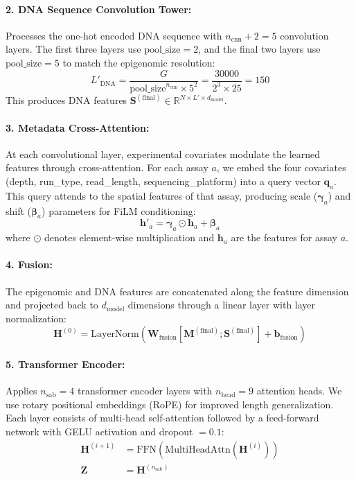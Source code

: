 \paragraph{2. DNA Sequence Convolution Tower:}
Processes the one-hot encoded DNA sequence with $n_{\text{cnn}} + 2 = 5$ convolution layers. The first three layers use $\text{pool\_size} = 2$, and the final two layers use $\text{pool\_size} = 5$ to match the epigenomic resolution:
\begin{equation}
    L'_{\text{DNA}} = \frac{G}{\text{pool\_size}^{n_{\text{cnn}}} \times 5^2} = \frac{30000}{2^3 \times 25} = 150
\end{equation}
This produces DNA features $\mathbf{S}^{(\text{final})} \in \mathbb{R}^{N \times L' \times d_{\text{model}}}$.

\paragraph{3. Metadata Cross-Attention:}
At each convolutional layer, experimental covariates modulate the learned features through cross-attention. For each assay $a$, we embed the four covariates (depth, run\_type, read\_length, sequencing\_platform) into a query vector $\mathbf{q}_a$. This query attends to the spatial features of that assay, producing scale ($\boldsymbol{\gamma}_a$) and shift ($\boldsymbol{\beta}_a$) parameters for FiLM conditioning:
\begin{equation}
    \mathbf{h}'_a = \boldsymbol{\gamma}_a \odot \mathbf{h}_a + \boldsymbol{\beta}_a
\end{equation}
where $\odot$ denotes element-wise multiplication and $\mathbf{h}_a$ are the features for assay $a$.

\paragraph{4. Fusion:}
The epigenomic and DNA features are concatenated along the feature dimension and projected back to $d_{\text{model}}$ dimensions through a linear layer with layer normalization:
\begin{equation}
    \mathbf{H}^{(0)} = \text{LayerNorm}\left(\mathbf{W}_{\text{fusion}} \left[\mathbf{M}^{(\text{final})}; \mathbf{S}^{(\text{final})}\right] + \mathbf{b}_{\text{fusion}}\right)
\end{equation}

\paragraph{5. Transformer Encoder:}
Applies $n_{\text{sab}} = 4$ transformer encoder layers with $n_{\text{head}} = 9$ attention heads. We use rotary positional embeddings (RoPE) for improved length generalization. Each layer consists of multi-head self-attention followed by a feed-forward network with GELU activation and dropout $= 0.1$:
\begin{align}
    \mathbf{H}^{(i+1)} &= \text{FFN}\left(\text{MultiHeadAttn}\left(\mathbf{H}^{(i)}\right)\right) \\
    \mathbf{Z} &= \mathbf{H}^{(n_{\text{sab}})}
\end{align}

